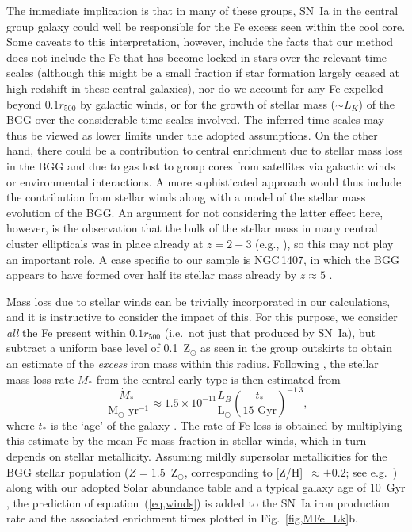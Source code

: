 \documentclass[useAMS,usenatbib]{mn2e}
\begin{document}
The immediate implication is that in many of these groups, SN~Ia in
the central group galaxy could well be responsible for the Fe excess
seen within the cool core. Some caveats to this interpretation,
however, include the facts that our method does not include the Fe
that has become locked in stars over the relevant time-scales
(although this might be a small fraction if star formation largely
ceased at high redshift in these central galaxies), nor do we account
for any Fe expelled beyond $0.1 r_{500}$ by galactic winds, or for the
growth of stellar mass ($\sim L_K$) of the BGG over the considerable
time-scales involved. The inferred time-scales may thus be viewed as
lower limits under the adopted assumptions. On the other hand, there
could be a contribution to central enrichment due to stellar mass loss
in the BGG and due to gas lost to group cores from satellites via
galactic winds or environmental interactions. A more sophisticated
approach would thus include the contribution from stellar winds along
with a model of the stellar mass evolution of the BGG. An argument for
not considering the latter effect here, however, is the observation
that the bulk of the stellar mass in many central cluster ellipticals
was in place already at $z=2-3$ (e.g., \citealt{stot08}), so this may
not play an important role. A case specific to our sample is
NGC\,1407, in which the BGG appears to have formed over half its
stellar mass already by $z\approx 5$ \citep{spol08}.

Mass loss due to stellar winds can be trivially incorporated in our
calculations, and it is instructive to consider the impact of
this. For this purpose, we consider {\em all} the Fe present within
$0.1 r_{500}$ (i.e.\ not just that produced by SN~Ia), but subtract a
uniform base level of 0.1~Z$_\odot$ as seen in the group outskirts to
obtain an estimate of the {\em excess} iron mass within this radius.
Following \citet{boeh04}, the stellar mass loss rate $\dot M_\ast$
from the central early-type is then estimated from
\begin{equation}\label{eq,winds}
  \frac{\dot M_\ast}{\mbox{ M$_\odot$~yr$^{-1}$}} \approx 1.5\times
  10^{-11} \frac{L_B}{\mbox{L$_\odot$}}
  \left(\frac{t_\ast}{\mbox{15~Gyr}}\right)^{-1.3} ,
\end{equation}
where $t_\ast$ is the `age' of the galaxy \citep{ciot91}. The rate of
Fe loss is obtained by multiplying this estimate by the mean Fe mass
fraction in stellar winds, which in turn depends on stellar
metallicity.  Assuming mildly supersolar metallicities for the BGG
stellar population ($Z=1.5$~Z$_\odot$, corresponding to [Z/H]~$\approx
+0.2$; see e.g.\ \citealt{sanc07}) along with our adopted Solar
abundance table \citep{grev98} and a typical galaxy age of 10~Gyr
\citep{sanc06}, the prediction of equation~(\ref{eq,winds}) is added
to the SN~Ia iron production rate and the associated enrichment times
plotted in Fig.~\ref{fig,MFe_Lk}b.
\end{document}
